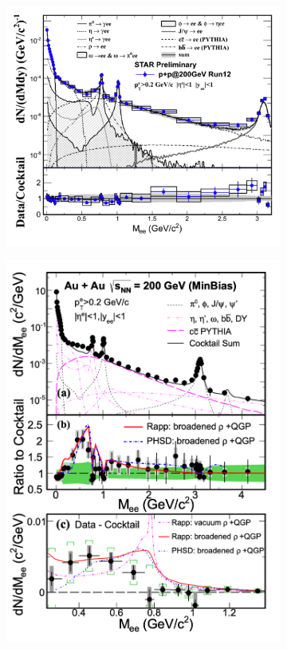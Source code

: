 \begin{figure}[htb]
    \centering
    \begin{subfigure}[b]{0.43\textwidth}
        \centering
        \includegraphics[width=\textwidth,clip]{figures/Chapter1/STARpp.png}
        \caption{}
        \label{fig:STARpp}
    \end{subfigure}
    \hfill
    \begin{subfigure}[b]{0.43\textwidth}
        \centering
        \includegraphics[width=\textwidth,clip]{figures/Chapter1/STARAuAu200.png}

\end{subfigure}
\end{figure}
